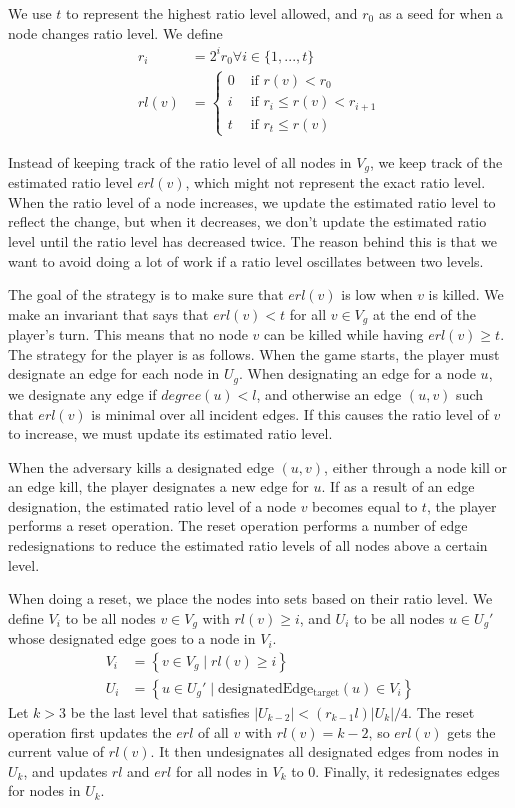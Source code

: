 We use $t$ to represent the highest ratio level allowed, and $r_0$ as a seed for when a node changes ratio level.
We define
\begin{align*}
r_i&=2^ir_0 \forall i \in \{1, ..., t\}\\
rl(v)&=\left\{
\begin{aligned}
0 &\text{ if }r(v)<r_0\\
i &\text{ if }r_i \leq r(v)< r_{i+1}\\
t &\text{ if }r_t \leq r(v)
\end{aligned}
\right.
\end{align*} 

Instead of keeping track of the ratio level of all nodes in $V_g$, we keep track of the estimated ratio level $erl(v)$, which might not represent the exact ratio level.
When the ratio level of a node increases, we update the estimated ratio level to reflect the change, but when it decreases, 
we don't update the estimated ratio level until the ratio level has decreased twice. 
The reason behind this is that we want to avoid doing a lot of work if a ratio level oscillates between two levels.

The goal of the strategy is to make sure that $erl(v)$ is low when $v$ is killed. We make an invariant that says that $erl(v) < t$ for all $v \in V_g$ at the end of the player's turn. 
This means that no node $v$ can be killed while having $erl(v)\geq t$.\\

The strategy for the player is as follows. 
When the game starts, the player must designate an edge for each node in $U_g$. When designating an edge for a node $u$, we designate any edge if $degree(u)<l$, 
and otherwise an edge $(u, v)$ such that $erl(v)$ is minimal over all incident edges. If this causes the ratio level of $v$ to increase, we must update its estimated ratio level.

When the adversary kills a designated edge $(u, v)$, either through a node kill or an edge kill, the player designates a new edge for $u$.
If as a result of an edge designation, the estimated ratio level of a node $v$ becomes equal to $t$, the player performs a reset operation.
The reset operation performs a number of edge redesignations to reduce the estimated ratio levels of all nodes above a certain level. 

When doing a reset, we place the nodes into sets based on their ratio level.
We define $V_i$ to be all nodes $v\in V_g$ with $rl(v) \geq i$, and $U_i$ to be all nodes $u \in U_g'$ whose designated edge goes to a node in $V_i$.
\begin{align*}
V_i&=\left\{v\in V_g\mid rl(v) \geq i\right\}\\
U_i&=\left\{u \in U_g'\mid  \mathrm{designatedEdge_{target}}(u) \in V_i\right\}
\end{align*}
Let $k>3$ be the last level that satisfies $|U_{k-2}|<(r_{k-1}l)|U_k|/4$.
The reset operation first updates the $erl$ of all $v$ with $rl(v)=k-2$, so $erl(v)$ gets the current value of $rl(v)$. 
It then undesignates all designated edges from nodes in $U_k$, and updates $rl$ and $erl$ for all nodes in $V_k$ to 0.
Finally, it redesignates edges for nodes in $U_k$.

